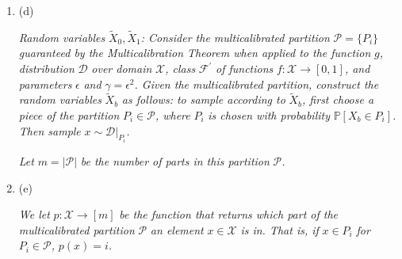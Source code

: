 \begin{enumerate}
\emph{We then define the randomized function }$g$\emph{ as:}\par


\[\begin{gathered}
g(x)=\begin{cases}0\nobreak\ \nobreak\ \text{with probability }\frac{\mathbb{P}[X_{0}=x]}{\mathbb{P}[X_{0}=x]+\mathbb{P}[X_{1}=x]}\\
1\nobreak\ \nobreak\ \text{with probability }\frac{\mathbb{P}[X_{1}=x]}{\mathbb{P}[X_{0}=x]+\mathbb{P}[X_{1}=x]}.\end{cases}
\end{gathered}\]





\item[] 
(d) 


\emph{Random variables }$\widetilde{X}_{0},\widetilde{X}_{1}$\emph{: Consider the multicalibrated partition }$\mathcal{P}=\{P_{i}\}$\emph{ guaranteed by the Multicalibration Theorem when applied to the function }$g$\emph{, distribution }$\mathcal{D}$\emph{ over domain }$\mathcal{X}$\emph{, class }$\mathcal{F}^{\prime}$\emph{ of functions }$f:\mathcal{X}\to[0,1]$\emph{, and parameters }$\epsilon$\emph{ and }$\gamma=\epsilon^{2}$\emph{. Given the multicalibrated partition, construct the random variables }$\widetilde{X}_{b}$\emph{ as follows: to sample according to }$\widetilde{X}_{b}$\emph{, first choose a piece of the partition }$P_{i}\in\mathcal{P}$\emph{, where }$P_{i}$\emph{ is chosen with probability }$\mathbb{P}[X_{b}\in P_{i}]$\emph{. Then sample }$x\sim\mathcal{D}|_{P_{i}}$\emph{.}\par




\emph{Let }$m=|\mathcal{P}|$\emph{ be the number of parts in this partition }$\mathcal{P}$\emph{.}\par





\item[] 
(e) 


\emph{We let }$p:\mathcal{X}\to[m]$\emph{ be the function that returns which part of the multicalibrated partition }$\mathcal{P}$\emph{ an element }$x\in\mathcal{X}$\emph{ is in. That is, if }$x\in P_{i}$\emph{ for }$P_{i}\in\mathcal{P}$\emph{, }$p(x)=i$\emph{.}\par





\end{enumerate}



